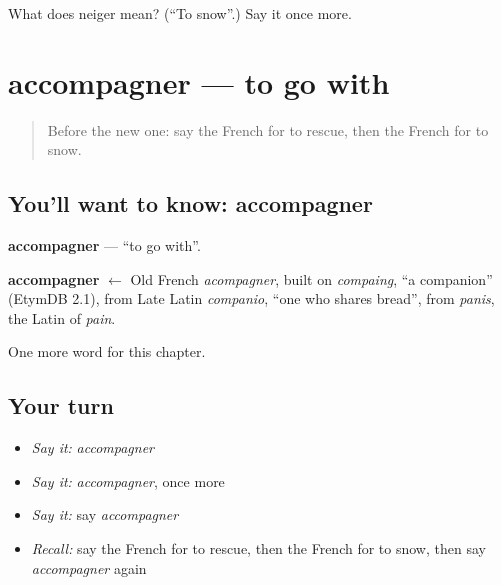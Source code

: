 \begin{tcolorbox}[breakable,colback=teal!4,colframe=teal!35!black,title={Before you move on}]
What does neiger mean? (\textquotedblleft{}To snow\textquotedblright{}.) Say it once more.
\end{tcolorbox}
\section[accompagner]{accompagner — to go with}

\label{lesson:FR-C178-accompagner}



\begin{quote}
Before the new one: say the French for to rescue, then the French for to snow.
\end{quote}

\subsection*{You'll want to know: accompagner}
\textbf{accompagner} — \textquotedblleft{}to go with\textquotedblright{}.

\begin{cousinweb}
\textbf{accompagner} $\leftarrow$ Old French \emph{acompagner}, built on \emph{compaing}, \textquotedblleft{}a companion\textquotedblright{} (EtymDB 2.1), from Late Latin \emph{companio}, \textquotedblleft{}one who shares bread\textquotedblright{}, from \emph{panis}, the Latin of \emph{pain}.
\end{cousinweb}

\begin{grammarlens}[title={What you've built}]
One more word for this chapter.
\end{grammarlens}

\subsection*{Your turn}
\begin{itemize}
\raggedright
  \item \emph{Say it:} \emph{accompagner}
  \item \emph{Say it:} \emph{accompagner}, once more
  \item \emph{Say it:} say \emph{accompagner}
  \item \emph{Recall:} say the French for to rescue, then the French for to snow, then say \emph{accompagner} again
\end{itemize}

